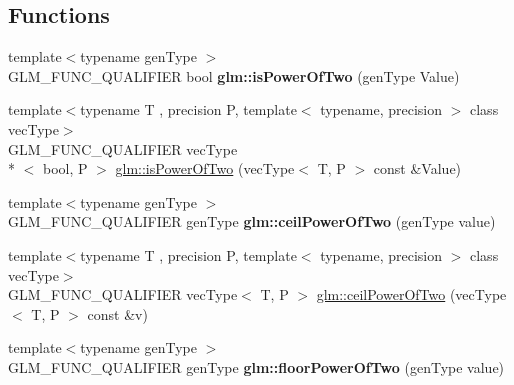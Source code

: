 \subsection*{Functions}
\begin{DoxyCompactItemize}
\item 
\hypertarget{namespaceglm_a2e60d24d864637d3ebd62e6fa4941613}{{\footnotesize template$<$typename gen\-Type $>$ }\\G\-L\-M\-\_\-\-F\-U\-N\-C\-\_\-\-Q\-U\-A\-L\-I\-F\-I\-E\-R bool {\bfseries glm\-::is\-Power\-Of\-Two} (gen\-Type Value)}\label{namespaceglm_a2e60d24d864637d3ebd62e6fa4941613}

\item 
{\footnotesize template$<$typename T , precision P, template$<$ typename, precision $>$ class vec\-Type$>$ }\\G\-L\-M\-\_\-\-F\-U\-N\-C\-\_\-\-Q\-U\-A\-L\-I\-F\-I\-E\-R vec\-Type\\*
$<$ bool, P $>$ \hyperlink{group__gtc__round_gad454e4c8d8cd73ddc7de855f733a1465}{glm\-::is\-Power\-Of\-Two} (vec\-Type$<$ T, P $>$ const \&Value)
\item 
\hypertarget{namespaceglm_a15ad0f1b70561471f34bc2e43469424e}{{\footnotesize template$<$typename gen\-Type $>$ }\\G\-L\-M\-\_\-\-F\-U\-N\-C\-\_\-\-Q\-U\-A\-L\-I\-F\-I\-E\-R gen\-Type {\bfseries glm\-::ceil\-Power\-Of\-Two} (gen\-Type value)}\label{namespaceglm_a15ad0f1b70561471f34bc2e43469424e}

\item 
{\footnotesize template$<$typename T , precision P, template$<$ typename, precision $>$ class vec\-Type$>$ }\\G\-L\-M\-\_\-\-F\-U\-N\-C\-\_\-\-Q\-U\-A\-L\-I\-F\-I\-E\-R vec\-Type$<$ T, P $>$ \hyperlink{group__gtc__round_ga76ec9b214ea1376fe09a903e34bab847}{glm\-::ceil\-Power\-Of\-Two} (vec\-Type$<$ T, P $>$ const \&v)
\item 
\hypertarget{namespaceglm_ac1385510b859757901e927c43bf4f329}{{\footnotesize template$<$typename gen\-Type $>$ }\\G\-L\-M\-\_\-\-F\-U\-N\-C\-\_\-\-Q\-U\-A\-L\-I\-F\-I\-E\-R gen\-Type {\bfseries glm\-::floor\-Power\-Of\-Two} (gen\-Type value)}\label{namespaceglm_ac1385510b859757901e927c43bf4f329}


\end{DoxyCompactItemize}
